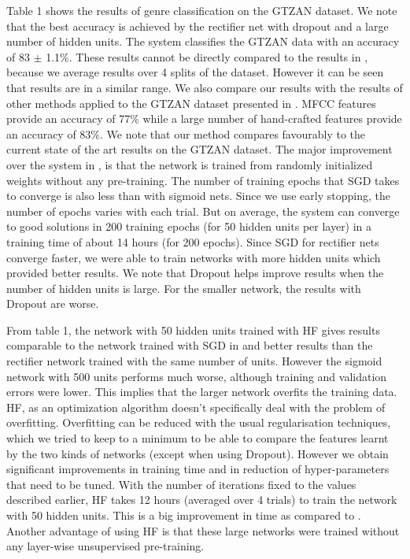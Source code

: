 \documentclass{article}
\begin{document}
Table 1 shows the results of genre classification on the GTZAN dataset. We note that the best accuracy is achieved by the rectifier net with dropout and a large number of hidden units. The system classifies the GTZAN data with an accuracy of 83 $\pm$ 1.1\%. These results cannot be directly compared to the results in \cite{hamel2010learning}, because we average results over 4 splits of the dataset. However it can be seen that results are in a similar range. We also compare our results with the results of other methods applied to the GTZAN dataset presented in \cite{henaff2011unsupervised}. MFCC features provide an accuracy of 77\% while a large number of hand-crafted features provide an accuracy of 83\%. We note that our method compares favourably to the current state of the art results on the GTZAN dataset. The major improvement over the system in \cite{hamel2010learning}, is that the network is trained from randomly initialized weights without any pre-training. The number of training epochs that SGD takes to converge is also less than with sigmoid nets. Since we use early stopping, the number of epochs varies with each trial. But on average, the system can converge to good solutions in 200 training epochs (for 50 hidden units per layer) in a training time of about 14 hours (for 200 epochs). Since SGD for rectifier nets converge faster, we were able to train networks with more hidden units which provided better results. We note that Dropout helps improve results when the number of hidden units is large. For the smaller network, the results with Dropout are worse. 

From table 1, the network with 50 hidden units trained with HF gives results comparable to the network trained with SGD in \cite{hamel2010learning} and better results than the rectifier network trained with the same number of units. However the sigmoid network with 500 units performs much worse, although training and validation errors were lower. This implies that the larger network overfits the training data. HF, as an optimization algorithm doesn't specifically deal with the problem of overfitting. Overfitting can be reduced with the usual regularisation techniques, which we tried to keep to a minimum to be able to compare the features learnt by the two kinds of networks (except when using Dropout). However we obtain significant improvements in training time and in reduction of hyper-parameters that need to be tuned. With the number of iterations fixed to the values described earlier, HF takes 12 hours (averaged over 4 trials) to train the network with 50 hidden units. This is a big improvement in time as compared to \cite{hamel2010learning}. Another advantage of using HF is that these large networks were trained without any layer-wise unsupervised pre-training. 
\end{document}
